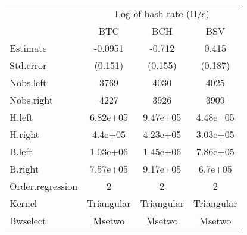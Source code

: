 
\begin{tabular}[t]{lccc}
\toprule
\multicolumn{1}{c}{ } & \multicolumn{3}{c}{Log of hash rate (H/s)} \\
\cmidrule(l{3pt}r{3pt}){2-4}
 & BTC & BCH & BSV\\
\midrule
Estimate & -0.0951 & -0.712 & 0.415\\
Std.error & (0.151) & (0.155) & (0.187)\\
\midrule
Nobs.left & 3769 & 4030 & 4025\\
Nobs.right & 4227 & 3926 & 3909\\
H.left & 6.82e+05 & 9.47e+05 & 4.48e+05\\
H.right & 4.4e+05 & 4.23e+05 & 3.03e+05\\
B.left & 1.03e+06 & 1.45e+06 & 7.86e+05\\
B.right & 7.57e+05 & 9.17e+05 & 6.7e+05\\
Order.regression & 2 & 2 & 2\\
Kernel & Triangular & Triangular & Triangular\\
Bwselect & Msetwo & Msetwo & Msetwo\\
\bottomrule
\end{tabular}

